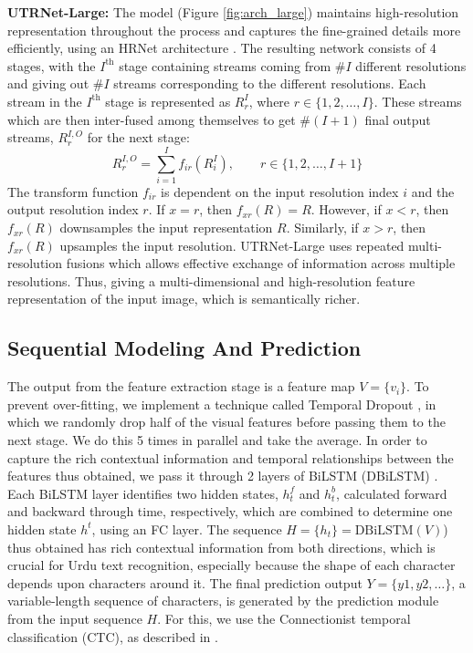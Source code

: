 \documentclass[runningheads]{llncs}
\newcommand{\ModelName}{{UTRNet}\xspace}
\newcommand{\mypara}[1]{\vspace{0.5em} \noindent \textbf{#1:}}
\begin{document}
\mypara{\ModelName-Large}
The model (Figure \ref{fig:arch_large}) maintains high-resolution representation throughout the process and captures the fine-grained details more efficiently, using an HRNet architecture \cite{hrnet_orig}. The resulting network consists of 4 stages, with the $I^\text{th}$ stage containing streams coming from $\#I$ different resolutions and giving out $\#I$ streams corresponding to the different resolutions. Each stream in the $I^\text{th}$ stage is represented as $R^{I}_{r}$, where $r \in \{1,2,\ldots,I\}$. These streams which are then inter-fused among themselves to get $\#(I+1)$ final output streams, $R^{I,O}_{r}$ for the next stage:
\[
R^{I,O}_{r}= \sum_{i=1}^{I} f_{ir}(R^{I}_{i}) , \qquad r \in \{1,2,\ldots, I+1\} 
\]
The transform function $f_{ir}$ is dependent on the input resolution index $i$ and the output resolution index $r$. If $x=r$, then $f_{xr}(R)=R$. However, if $x<r$, then $f_{xr}(R)$ downsamples the input representation $R$. Similarly, if $x>r$, then $f_{xr}(R)$ upsamples the input resolution. \ModelName-Large uses repeated multi-resolution fusions which allows effective exchange of information across multiple resolutions. Thus, giving a multi-dimensional and high-resolution feature representation of the input image, which is semantically richer.

\subsection{Sequential Modeling And Prediction}

The output from the feature extraction stage is a feature map $V = \{v_i\}$. To prevent over-fitting, we implement a technique called Temporal Dropout \cite{temporal_orig}, in which we randomly drop half of the visual features before passing them to the next stage. We do this 5 times in parallel and take the average. In order to capture the rich contextual information and temporal relationships between the features thus obtained, we pass it through 2 layers of BiLSTM \cite{bilsm_orig} (DBiLSTM) \cite{crnn_orig}. Each BiLSTM layer identifies two hidden states, $h^{f}_t$ and $h^{b}_t$, calculated forward and backward through time, respectively, which are combined to determine one hidden state $h^{t}$, using an FC layer. The sequence $H=\{h_t\}=\text{DBiLSTM}(V)$) thus obtained has rich contextual information from both directions, which is crucial for Urdu text recognition, especially because the shape of each character depends upon characters around it. The final prediction output $Y = \{y1, y2, \ldots\}$, a variable-length sequence of characters, is generated by the prediction module from the input sequence $H$. For this, we use the Connectionist temporal classification (CTC), as described in \cite{ctc_paper}.
 
\end{document}
